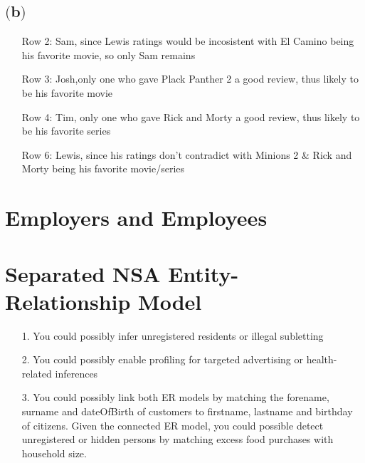 \subsection{$($b$)$}

\begin{itemize}
	\item[Row 2:] Sam, since Lewis ratings would be incosistent with El Camino being his favorite movie, so only Sam remains
	\item[Row 3:] Josh,only one who gave Plack Panther 2 a good review, thus likely to be his favorite movie	
	\item[Row 4:] Tim, only one who gave Rick and Morty a good review, thus likely to be his favorite series
	\item[Row 6:] Lewis, since his ratings don't contradict with Minions 2 \& Rick and Morty being his favorite movie/series
\end{itemize}
	
\section{Employers and Employees }	
	
\section{Separated NSA Entity-Relationship Model }

\begin{itemize}
	\item[1.] You could possibly infer unregistered residents or illegal subletting
	\item[2.] You could possibly enable profiling for targeted advertising or health-related inferences
	\item[3.] You could possibly link both ER models by matching the forename, surname and dateOfBirth of customers to firstname, lastname and birthday of citizens. Given the connected ER model, you could possible detect unregistered or hidden persons by matching excess food purchases with household size.
\end{itemize}

